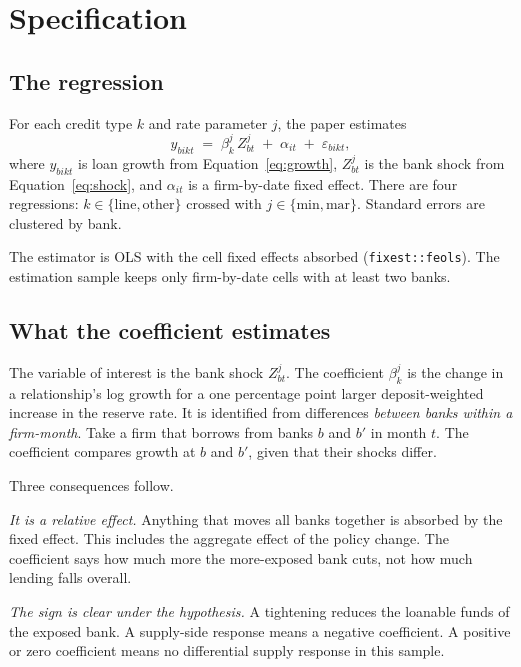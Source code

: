 \documentclass[11pt]{article}
\newcommand{\code}[1]{\texttt{#1}}
\renewcommand{\_}{\origunderscore\hspace{0pt}}  %
\begin{document}
\section{Specification}
\label{sec:spec}

\subsection{The regression}

For each credit type $k$ and rate parameter $j$, the paper estimates
\begin{equation}
y_{bikt} \;=\; \beta^{j}_{k}\, Z^{j}_{bt} \;+\; \alpha_{it} \;+\; \varepsilon_{bikt},
\label{eq:main}
\end{equation}
where $y_{bikt}$ is loan growth from Equation~\eqref{eq:growth}, $Z^{j}_{bt}$ is the bank shock from Equation~\eqref{eq:shock}, and $\alpha_{it}$ is a firm-by-date fixed effect.
There are four regressions: $k\in\{\text{line},\text{other}\}$ crossed with $j\in\{\text{min},\text{mar}\}$.
Standard errors are clustered by bank.

The estimator is OLS with the cell fixed effects absorbed (\code{fixest::feols}).
The estimation sample keeps only firm-by-date cells with at least two banks.

\subsection{What the coefficient estimates}

The variable of interest is the bank shock $Z^{j}_{bt}$.
The coefficient $\beta^{j}_{k}$ is the change in a relationship's log growth for a one percentage point larger deposit-weighted increase in the reserve rate.
It is identified from differences \textit{between banks within a firm-month}.
Take a firm that borrows from banks $b$ and $b'$ in month $t$.
The coefficient compares growth at $b$ and $b'$, given that their shocks differ.

Three consequences follow.

\textit{It is a relative effect.}
Anything that moves all banks together is absorbed by the fixed effect.
This includes the aggregate effect of the policy change.
The coefficient says how much more the more-exposed bank cuts, not how much lending falls overall.

\textit{The sign is clear under the hypothesis.}
A tightening reduces the loanable funds of the exposed bank.
A supply-side response means a negative coefficient.
A positive or zero coefficient means no differential supply response in this sample.
\end{document}
